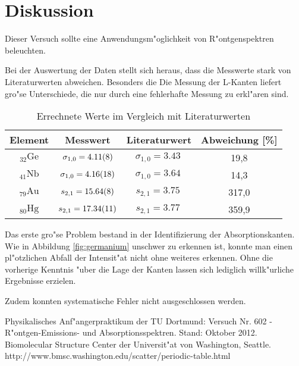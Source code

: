 \newpage
\section{Diskussion}
	\label{sec:diskussion}
	Dieser Versuch sollte eine Anwendungsm"oglichkeit von R"ontgenspektren beleuchten.

	Bei der Auswertung der Daten stellt sich heraus, dass die Messwerte stark von Literaturwerten abweichen. Besonders die Die Messung der L-Kanten liefert gro"se Unterschiede, die nur durch eine fehlerhafte Messung zu erkl"aren sind.

	\begin{table}[h!]
		\centering
		\caption{Errechnete Werte im Vergleich mit Literaturwerten \cite{literatur}}
		\begin{tabular}{|c|c|c|c|}
			\hline
			Element & Messwert & Literaturwert & Abweichung [\%] \\
			\hline
			\hline
			${}_{32}^{}\mathrm{Ge}$ & $\sigma_{1,0} = \SI{4.11 (8)}{}$ & $\sigma_{1,0} = \SI{3.43}{}$ & 19,8 \\
			${}_{41}^{}\mathrm{Nb}$ & $\sigma_{1,0} = \SI{4.16 (18)}{}$ & $\sigma_{1,0} = \SI{3.64}{}$ & 14,3 \\
			${}_{79}^{}\mathrm{Au}$ & $s_{2,1} = \SI{15.64 (8)}{}$ & $s_{2,1} = \SI{3.75}{}$ & 317,0 \\
			${}_{80}^{}\mathrm{Hg}$ & $s_{2,1} = \SI{17.34 (11)}{}$ & $s_{2,1} = \SI{3.77}{}$ & 359,9 \\
			\hline
		\end{tabular}		
	\end{table}

	Das erste gro"se Problem bestand in der Identifizierung der Absorptionskanten.
	Wie in Abbildung \ref{fig:germanium} unschwer zu erkennen ist, konnte man einen pl"otzlichen Abfall der Intensit"at nicht ohne weiteres erkennen.
	Ohne die vorherige Kenntnis "uber die Lage der Kanten lassen sich lediglich willk"urliche Ergebnisse erzielen.

	Zudem konnten systematische Fehler nicht ausgeschlossen werden.
	
\begin{thebibliography}{9}
	 Physikalisches Anf"angerpraktikum der TU Dortmund: Versuch Nr. 602 - R"ontgen-Emissions- und Absorptionsspektren. Stand: Oktober 2012.
	 Biomolecular Structure Center der Universit"at von Washington, Seattle. http://www.bmsc.washington.edu/scatter/periodic-table.html
\end{thebibliography}